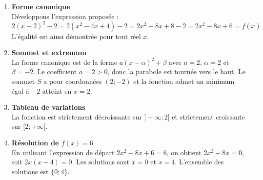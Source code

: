 \documentclass[11pt,a4paper]{article}
\begin{document}
\begin{enumerate}
    \item \textbf{Forme canonique}\\
    Développons l'expression proposée :
    $$2(x - 2)^2 - 2 = 2(x^2 - 4x + 4) - 2 = 2x^2 - 8x + 8 - 2 = 2x^2 - 8x + 6 = f(x)$$
    L'égalité est ainsi démontrée pour tout réel $x$.

    \item \textbf{Sommet et extremum}\\
    La forme canonique est de la forme $a(x - \alpha)^2 + \beta$ avec $a = 2$, $\alpha = 2$ et $\beta = -2$.
    Le coefficient $a = 2 > 0$, donc la parabole est tournée vers le haut.
    Le sommet $S$ a pour coordonnées $(2 ; -2)$ et la fonction admet un minimum égal à $-2$ atteint en $x = 2$.

    \item \textbf{Tableau de variations}\\
    La fonction est strictement décroissante sur $]-\infty ; 2]$ et strictement croissante sur $[2 ; +\infty[$.

    \item \textbf{Résolution de $f(x) = 6$}\\
    En utilisant l'expression de départ $2x^2 - 8x + 6 = 6$, on obtient $2x^2 - 8x = 0$, soit $2x(x - 4) = 0$.
    Les solutions sont $x = 0$ et $x = 4$. L'ensemble des solutions est $\{0 ; 4\}$.
\end{enumerate}
\end{document}
